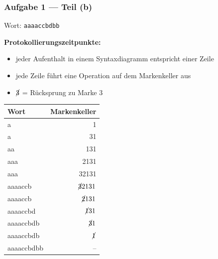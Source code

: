 \documentclass{beamer}
\begin{document}
\begin{frame} \frametitle{Aufgabe 1 --- Teil (b)}
	\begin{minipage}{\dimexpr0.5\linewidth-\fboxrule-\fboxsep}
		Wort: \texttt{aaaaccbdbb}
		
		\vspace{2em} \small
		\textbf{Protokollierungszeitpunkte:}
		\begin{itemize}
			\item jeder Aufenthalt in einem Syntaxdiagramm entspricht einer Zeile
			\item jede Zeile führt eine Operation auf dem Markenkeller aus
			\item $\cancel{3}$ = Rücksprung zu Marke $3$
		\end{itemize}
	\end{minipage}
	\pause
	\begin{minipage}{\dimexpr0.5\linewidth-\fboxrule-\fboxsep}
		\centering
		\begin{tabular}{l|r}
			\hline
			Wort & Markenkeller \\ \hline \pause
			a & 1 \\ \pause
			a & 31 \\ \pause
			aa & 131 \\ \pause
			aaa & 2131 \\ \pause
			aaa & 32131 \\ \pause
			aaaaccb & $\cancel{3} 2131$ \\ \pause
			aaaaccb & $\cancel{2}131$ \\ \pause
			aaaaccbd & $\cancel{1}31$ \\ \pause
			aaaaccbdb & $\cancel{3}1$ \\ \pause
			aaaaccbdb & $\cancel{1}$ \\ \pause
			aaaaccbdbb & -- \\ \hline
		\end{tabular}
	\end{minipage}
\end{frame}
\end{document}
